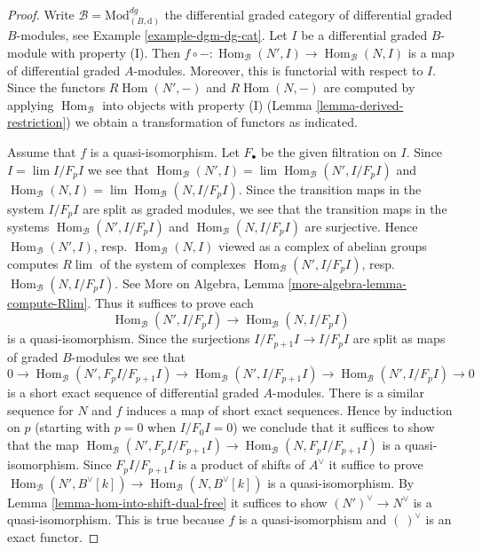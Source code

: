 \documentclass{stacks-project}
\theoremstyle{plain}
\theoremstyle{definition}
\theoremstyle{remark}
\numberwithin{equation}{subsection}
\def\lim{\mathop{\mathrm{lim}}\nolimits}
\def\Hom{\mathop{\mathrm{Hom}}\nolimits}
\begin{document}
\begin{proof}
Write $\mathcal{B} = \text{Mod}^{dg}_{(B, \text{d})}$ the
differential graded category of differential graded $B$-modules, see
Example \ref{example-dgm-dg-cat}.
Let $I$ be a differential graded $B$-module with property (I).
Then $f \circ - : \Hom_\mathcal{B}(N', I) \to \Hom_\mathcal{B}(N, I)$
is a map of differential graded $A$-modules. Moreover, this is functorial
with respect to $I$. Since the functors
$ R\Hom(N', -)$ and $R\Hom(N, -)$ are
computed by applying $\Hom_\mathcal{B}$ into objects with property (I)
(Lemma \ref{lemma-derived-restriction}) we obtain a transformation of functors
as indicated.

\medskip\noindent
Assume that $f$ is a quasi-isomorphism. Let $F_\bullet$ be the
given filtration on $I$. Since $I = \lim I/F_pI$ we see that
$\Hom_\mathcal{B}(N', I) = \lim \Hom_\mathcal{B}(N', I/F_pI)$ and
$\Hom_\mathcal{B}(N, I) = \lim \Hom_\mathcal{B}(N, I/F_pI)$.
Since the transition maps in the system $I/F_pI$ are split
as graded modules, we see that the transition maps in the
systems $\Hom_\mathcal{B}(N', I/F_pI)$ and $\Hom_\mathcal{B}(N, I/F_pI)$
are surjective. Hence $\Hom_\mathcal{B}(N', I)$, resp. $\Hom_\mathcal{B}(N, I)$
viewed as a complex of abelian groups computes $R\lim$ of the system
of complexes
$\Hom_\mathcal{B}(N', I/F_pI)$, resp. $\Hom_\mathcal{B}(N, I/F_pI)$.
See More on Algebra, Lemma \ref{more-algebra-lemma-compute-Rlim}.
Thus it suffices to prove each
$$
\Hom_\mathcal{B}(N', I/F_pI) \to \Hom_\mathcal{B}(N, I/F_pI)
$$
is a quasi-isomorphism. Since the surjections $I/F_{p + 1}I \to I/F_pI$
are split as maps of graded $B$-modules we see that
$$
0 \to \Hom_\mathcal{B}(N', F_pI/F_{p + 1}I) \to
\Hom_\mathcal{B}(N', I/F_{p + 1}I) \to
\Hom_\mathcal{B}(N', I/F_pI) \to 0
$$
is a short exact sequence of differential graded $A$-modules.
There is a similar sequence for $N$ and $f$ induces a map
of short exact sequences. Hence by induction on $p$ (starting with $p = 0$
when $I/F_0I = 0$) we conclude that it suffices to show that
the map
$\Hom_\mathcal{B}(N', F_pI/F_{p + 1}I) \to \Hom_\mathcal{B}(N, F_pI/F_{p + 1}I)$
is a quasi-isomorphism. Since $F_pI/F_{p + 1}I$ is a product of shifts of
$A^\vee$ it suffice to prove
$\Hom_\mathcal{B}(N', B^\vee[k]) \to \Hom_\mathcal{B}(N, B^\vee[k])$
is a quasi-isomorphism. By Lemma \ref{lemma-hom-into-shift-dual-free}
it suffices to show $(N')^\vee \to N^\vee$ is a quasi-isomorphism.
This is true because $f$ is a quasi-isomorphism and $(\ )^\vee$
is an exact functor.
\end{proof}
\end{document}
